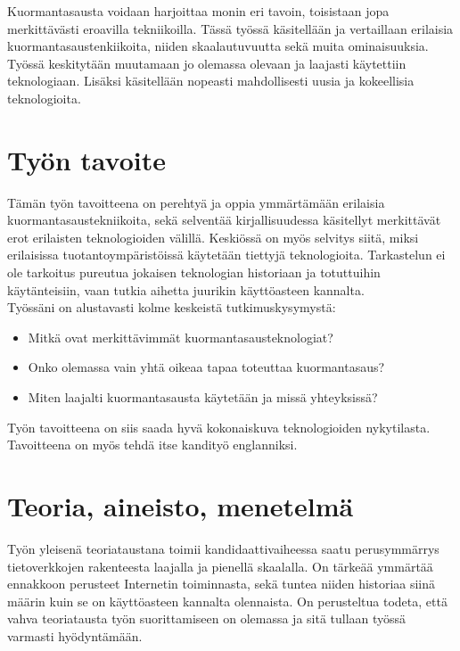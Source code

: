 \documentclass[finnish,12pt,a4paper,elec,utf8]{aaltothesis}
\begin{document}
Kuormantasausta voidaan harjoittaa monin eri tavoin, toisistaan jopa merkittävästi eroavilla tekniikoilla.
Tässä työssä käsitellään ja vertaillaan erilaisia kuormantasaustenkiikoita, niiden skaalautuvuutta sekä muita ominaisuuksia.
Työssä keskitytään muutamaan jo olemassa olevaan ja laajasti käytettiin teknologiaan.
Lisäksi käsitellään nopeasti mahdollisesti uusia ja kokeellisia teknologioita.

\newpage

\section{Työn tavoite}
Tämän työn tavoitteena on perehtyä ja oppia ymmärtämään erilaisia kuormantasaustekniikoita, sekä selventää kirjallisuudessa käsitellyt merkittävät erot erilaisten teknologioiden välillä.
Keskiössä on myös selvitys siitä, miksi erilaisissa tuotantoympäristöissä käytetään tiettyjä teknologioita.
Tarkastelun ei ole tarkoitus pureutua jokaisen teknologian historiaan ja totuttuihin käytänteisiin, vaan tutkia aihetta juurikin käyttöasteen kannalta.\\

Työssäni on alustavasti kolme keskeistä tutkimuskysymystä:
\begin{itemize}
    \item Mitkä ovat merkittävimmät kuormantasausteknologiat?
    \item Onko olemassa vain yhtä oikeaa tapaa toteuttaa kuormantasaus?
    \item Miten laajalti kuormantasausta käytetään ja missä yhteyksissä?
\end{itemize}
Työn tavoitteena on siis saada hyvä kokonaiskuva teknologioiden nykytilasta.
Tavoitteena on myös tehdä itse kandityö englanniksi.

\newpage

\section{Teoria, aineisto, menetelmä}

Työn yleisenä teoriataustana toimii kandidaattivaiheessa saatu perusymmärrys tietoverkkojen rakenteesta laajalla ja pienellä skaalalla.
On tärkeää ymmärtää ennakkoon perusteet Internetin toiminnasta, sekä tuntea niiden historiaa siinä määrin kuin se on käyttöasteen kannalta olennaista.
On perusteltua todeta, että vahva teoriatausta työn suorittamiseen on olemassa ja sitä tullaan työssä varmasti hyödyntämään.
\end{document}
